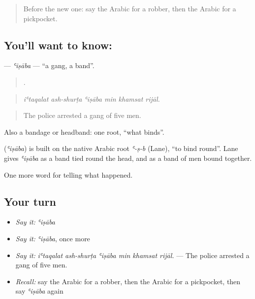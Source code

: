 \label{lesson:AR-C321-isaba}



\begin{quote}
Before the new one: say the Arabic for a robber, then the Arabic for a pickpocket.
\end{quote}

\subsection*{You'll want to know: }
\textbf{} — \emph{ʿiṣāba} — \textquotedblleft{}a gang, a band\textquotedblright{}.

\begin{quote}
     .
\end{quote}

\begin{quote}
\emph{iʿtaqalat ash-shurṭa ʿiṣāba min khamsat rijāl.}
\end{quote}

\begin{quote}
The police arrested a gang of five men.
\end{quote}

Also a bandage or headband: one root, \textquotedblleft{}what binds\textquotedblright{}.

\begin{cousinweb}
\textbf{} (\emph{ʿiṣāba}) is built on the native Arabic root \emph{ʿ-ṣ-b} (Lane), \textquotedblleft{}to bind round\textquotedblright{}. Lane gives \emph{ʿiṣāba} as a band tied round the head, and as a band of men bound together.
\end{cousinweb}

\begin{grammarlens}[title={What you've built}]
One more word for telling what happened.
\end{grammarlens}

\subsection*{Your turn}
\begin{itemize}
\raggedright
  \item \emph{Say it:} \emph{ʿiṣāba}
  \item \emph{Say it:} \emph{ʿiṣāba}, once more
  \item \emph{Say it:} \emph{iʿtaqalat ash-shurṭa ʿiṣāba min khamsat rijāl.} — The police arrested a gang of five men.
  \item \emph{Recall:} say the Arabic for a robber, then the Arabic for a pickpocket, then say \emph{ʿiṣāba} again
\end{itemize}

